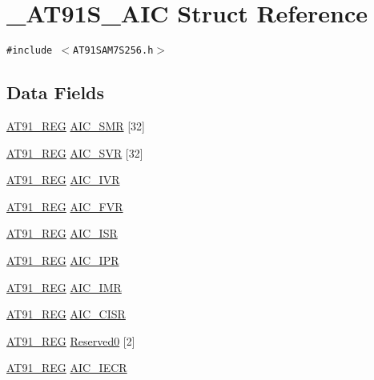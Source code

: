 \hypertarget{struct__AT91S__AIC}{
\section{\_\-AT91S\_\-AIC Struct Reference}
\label{struct__AT91S__AIC}
}
{\tt \#include $<$AT91SAM7S256.h$>$}

\subsection*{Data Fields}
\begin{CompactItemize}
\item 
\hyperlink{AT91SAM7X256_8h_712ad5a1ac1bd02f3e95a7526c283ce1}{AT91\_\-REG} \hyperlink{struct__AT91S__AIC_8f67e50f87c9ec1296d138c8823956a9}{AIC\_\-SMR} \mbox{[}32\mbox{]}
\item 
\hyperlink{AT91SAM7X256_8h_712ad5a1ac1bd02f3e95a7526c283ce1}{AT91\_\-REG} \hyperlink{struct__AT91S__AIC_ab87ea86f3a65a32f8d4c788cc8c56ae}{AIC\_\-SVR} \mbox{[}32\mbox{]}
\item 
\hyperlink{AT91SAM7X256_8h_712ad5a1ac1bd02f3e95a7526c283ce1}{AT91\_\-REG} \hyperlink{struct__AT91S__AIC_f105953c155379836fce666eef37501b}{AIC\_\-IVR}
\item 
\hyperlink{AT91SAM7X256_8h_712ad5a1ac1bd02f3e95a7526c283ce1}{AT91\_\-REG} \hyperlink{struct__AT91S__AIC_ccca387631438422260c8a8652800eed}{AIC\_\-FVR}
\item 
\hyperlink{AT91SAM7X256_8h_712ad5a1ac1bd02f3e95a7526c283ce1}{AT91\_\-REG} \hyperlink{struct__AT91S__AIC_3634430d76ed81bcbd9f0b04f9c0907e}{AIC\_\-ISR}
\item 
\hyperlink{AT91SAM7X256_8h_712ad5a1ac1bd02f3e95a7526c283ce1}{AT91\_\-REG} \hyperlink{struct__AT91S__AIC_9ae6e5e104c8f5a405a1792e5126236a}{AIC\_\-IPR}
\item 
\hyperlink{AT91SAM7X256_8h_712ad5a1ac1bd02f3e95a7526c283ce1}{AT91\_\-REG} \hyperlink{struct__AT91S__AIC_2eecd9e74afeac555e7b90c3594bc910}{AIC\_\-IMR}
\item 
\hyperlink{AT91SAM7X256_8h_712ad5a1ac1bd02f3e95a7526c283ce1}{AT91\_\-REG} \hyperlink{struct__AT91S__AIC_c1e7c71a265c9818fe96b59796aaed7e}{AIC\_\-CISR}
\item 
\hyperlink{AT91SAM7X256_8h_712ad5a1ac1bd02f3e95a7526c283ce1}{AT91\_\-REG} \hyperlink{struct__AT91S__AIC_aaee23426dcf3698e52ba1953ac4a752}{Reserved0} \mbox{[}2\mbox{]}
\item 
\hyperlink{AT91SAM7X256_8h_712ad5a1ac1bd02f3e95a7526c283ce1}{AT91\_\-REG} \hyperlink{struct__AT91S__AIC_c37f1ca270fc1c2ba4857b5f9c763176}{AIC\_\-IECR}

\end{CompactItemize}
